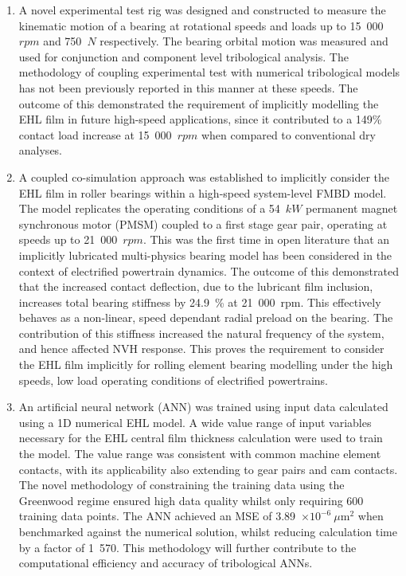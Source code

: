 \begin{enumerate}
	\item A novel experimental test rig was designed and constructed to measure the kinematic motion of a bearing at rotational speeds and loads up to 15~000~$rpm$ and 750~$N$ respectively. The bearing orbital motion was measured and used for conjunction and component level tribological analysis. The methodology of coupling experimental test with numerical tribological models has not been previously reported in this manner at these speeds. The outcome of this demonstrated the requirement of implicitly modelling the EHL film in future high-speed applications, since it contributed to a 149\% contact load increase at 15~000~$rpm$ when compared to conventional dry analyses.
	
	\item A coupled co-simulation approach was established to implicitly consider the EHL film in roller bearings within a high-speed system-level FMBD model. The model replicates the operating conditions of a 54~$kW$ permanent magnet synchronous motor (PMSM) coupled to a first stage gear pair, operating at speeds up to 21~000~$rpm$. This was the first time in open literature that an implicitly lubricated multi-physics bearing model has been considered in the context of electrified powertrain dynamics. The outcome of this demonstrated that the increased contact deflection, due to the lubricant film inclusion, increases total bearing stiffness by 24.9~\% at 21~000~rpm. This effectively behaves as a non-linear, speed dependant radial preload on the bearing. The contribution of this stiffness increased the natural frequency of the system, and hence affected NVH response. This proves the requirement to consider the EHL film implicitly for rolling element bearing modelling under the high speeds, low load operating conditions of electrified powertrains.
	
	\item An artificial neural network (ANN) was trained using input data calculated using a 1D numerical EHL model. A wide value range of input variables necessary for the EHL central film thickness calculation were used to train the model. The value range was consistent with common machine element contacts, with its applicability also extending to gear pairs and cam contacts. The novel methodology of constraining the training data using the Greenwood regime ensured high data quality whilst only requiring 600 training data points. The ANN achieved an MSE of 3.89~$\times 10^{-6}~\mu \mathrm{m}^2$ when benchmarked against the numerical solution, whilst reducing calculation time by a factor of 1~570. This methodology will further contribute to the computational efficiency and accuracy of tribological ANNs.
	

\end{enumerate}

